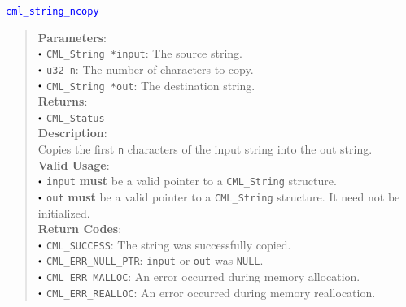 \documentclass[a4paper,oneside,10pt]{article}
\newcommand{\function}[1]{
  \noindent\textcolor{blue}{\texttt{#1}}
  \vspace{-0.3em}
}
\renewcommand{\dot}{\raisebox{0.3ex}{\scalebox{0.6}{$\bullet$}}}
\theoremstyle{definition}
\begin{document}
\function{cml\_string\_ncopy}
\begin{quote}
  \textbf{Parameters}: \\
  $\dot$ \texttt{CML\_String *input}: The source string. \\
  $\dot$ \texttt{u32 n}: The number of characters to copy. \\
  $\dot$ \texttt{CML\_String *out}: The destination string. \\
  \textbf{Returns}: \\
  $\dot$ \texttt{CML\_Status} \\
  
  \vspace{-0.75em}
  \textbf{Description}: \\
  Copies the first \texttt{n} characters of the input string into the out string. \\

  \vspace{-0.75em}
  \textbf{Valid Usage}: \\
  $\dot$ \texttt{input} \textbf{must} be a valid pointer to a \texttt{CML\_String} structure. \\
  $\dot$ \texttt{out} \textbf{must} be a valid pointer to a \texttt{CML\_String} structure. It need not be initialized. \\

  \vspace{-0.75em}
  \textbf{Return Codes}: \\
  $\dot$ \texttt{CML\_SUCCESS}: The string was successfully copied. \\
  $\dot$ \texttt{CML\_ERR\_NULL\_PTR}: \texttt{input} or \texttt{out} was \texttt{NULL}. \\
  $\dot$ \texttt{CML\_ERR\_MALLOC}: An error occurred during memory allocation. \\
  $\dot$ \texttt{CML\_ERR\_REALLOC}: An error occurred during memory reallocation. \\
\end{quote}
\end{document}
